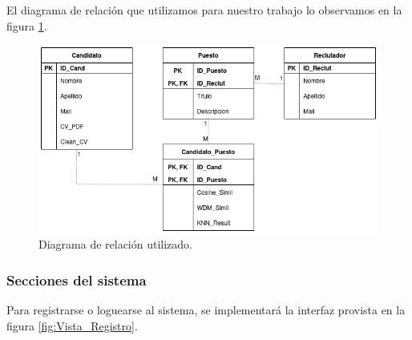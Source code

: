 \documentclass[12pt,a4paper]{article}
\begin{document}
\begin{sloppypar}
El diagrama de relación que utilizamos para nuestro trabajo lo observamos en la figura \ref{fig:Entity_Relation}.

\begin{figure}[H]    %
  \centering
  \includegraphics[width=1\textwidth]{images/BD_Entity_Relation.png}
  \caption{Diagrama de relación utilizado.}  
  \label{fig:Entity_Relation}
\end{figure}

\cleardoublepage

\subsubsection{Secciones del sistema}

Para registrarse o loguearse al sistema, se implementará la interfaz provista en la figura \ref{fig:Vista_Registro}.


\end{sloppypar}
\end{document}
